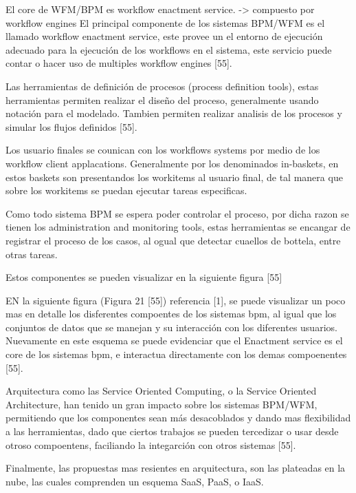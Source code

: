 El core de WFM/BPM es workflow enactment service. -> compuesto por workflow engines
El principal componente de los sistemas BPM/WFM es el llamado workflow enactment service, este provee un el entorno de ejecución adecuado para la ejecución de los workflows en el sistema, este servicio puede contar o hacer uso de multiples workflow engines [55]. 

Las herramientas de definición de procesos (process definition tools), estas herramientas permiten realizar el diseño del proceso, generalmente usando notación para el modelado. Tambien permiten realizar analisis de los procesos y simular los flujos definidos [55]. 


Los usuario finales se counican con los workflows systems por medio de los workflow client applacations. Generalmente por los denominados in-baskets, en estos baskets son presentandos los workitems al usuario final, de tal manera que sobre los workitems se puedan ejecutar tareas especificas. 

Como todo sistema BPM se espera poder controlar el proceso, por dicha razon se tienen los administration and monitoring tools, estas herramientas se encangar de registrar el proceso de los casos, al ogual que detectar cuaellos de bottela, entre otras tareas. 

Estos componentes se pueden visualizar en la siguiente figura [55]


EN la siguiente figura (Figura 21 [55]) referencia [1], se puede visualizar un poco mas en detalle los disferentes compoentes de los sistemas bpm, al igual que los conjuntos de datos que se manejan y su interacción con los diferentes usuarios. Nuevamente en este esquema se puede evidenciar que el Enactment service es el core de los sistemas bpm, e interactua directamente con los demas compoenentes [55].

Arquitectura como las Service Oriented Computing, o la Service Oriented Architecture, han tenido un gran impacto sobre los sistemas BPM/WFM, permitiendo que los componentes sean más desacoblados y dando mas flexibilidad a las herramientas, dado que ciertos trabajos se pueden tercedizar o usar desde otroso compoentens, faciliando la integarción con otros sistemas [55]. 

Finalmente, las propuestas mas resientes en arquitectura, son las plateadas en la nube, las cuales comprenden un esquema SaaS, PaaS, o IaaS. 



